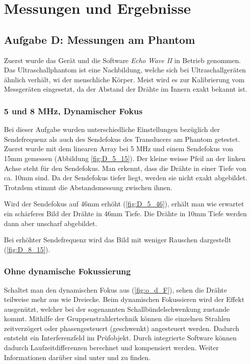\documentclass[11pt]{scrartcl}
\begin{document}
    \section{Messungen und Ergebnisse}

    \subsection{Aufgabe D: Messungen am Phantom}
    Zuerst wurde das Gerät und die Software \emph{Echo Wave II} in Betrieb genommen.
    Das Ultraschallphantom ist eine Nachbildung, welche sich bei Ultraschallgeräten ähnlich verhält, wi der menschliche Körper.
    Meist wird es zur Kalibrierung vom Messgeräten eingesetzt, da der Abstand der Drähte im Innern exakt bekannt ist.

    \subsubsection{5 und 8 MHz, Dynamischer Fokus}

    Bei dieser Aufgabe wurden unterschiedliche Einstellungen bezüglich der Sendefrequenz als auch des Sendefokus des Transducers am Phantom getestet.
    Zuerst wurde mit dem linearen Array bei 5 MHz und einem Sendefokus von 15mm gemessen (Abbildung \ref{fig:D_5_15}).
    Der kleine weisse Pfeil an der linken Achse steht für den Sendefokus.
    Man erkennt, dass die Drähte in einer Tiefe von ca. 10mm sind.
    Da der Sendefokus tiefer liegt, werden sie nicht exakt abgebildet.
    Trotzdem stimmt die Abstandsmessung zwischen ihnen.

    Wird der Sendefokus auf 46mm erhöht (\autoref{fig:D_5_46}), erhält man wie erwartet ein schärferes Bild der
    Drähte in 46mm Tiefe.
    Die Drähte in 10mm Tiefe werden dann aber unscharf abgebildet.

    Bei erhöhter Sendefrequenz wird das Bild mit weniger Rauschen dargestellt (\autoref{fig:D_8_15}).

    \subsubsection{Ohne dynamische Fokussierung}

    Schaltet man den dynamischen Fokus aus (\autoref{fig:o_d_F}), sehen die Drähte teilweise mehr aus wie
    Dreiecke.
    Beim dynamischen Fokussieren wird der Effekt ausgenützt, welcher bei der sogenannten Schallbündelschwenkung zustande
    kommt.
    Mithilfe der Gruppenstrahlertechnik können die einzelnen Strahlen zeitverzögert oder phasengesteuert (geschwenkt)
    angesteuert werden.
    Dadurch entsteht ein Interferenzfeld im Prüfobjekt.
    Durch integrierte Software können dadurch Laufzeitdifferenzen berechnet und kompensiert werden.
    Weiter Informationen darüber sind unter \cite{gruppenstrahler} und \cite{arraytechnik} zu finden.
\end{document}
